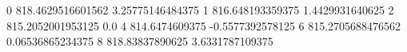 0 818.4629516601562 3.25775146484375
1 816.648193359375 1.4429931640625
2 815.2052001953125 0.0
4 814.6474609375 -0.5577392578125
6 815.2705688476562 0.06536865234375
8 818.83837890625 3.6331787109375
